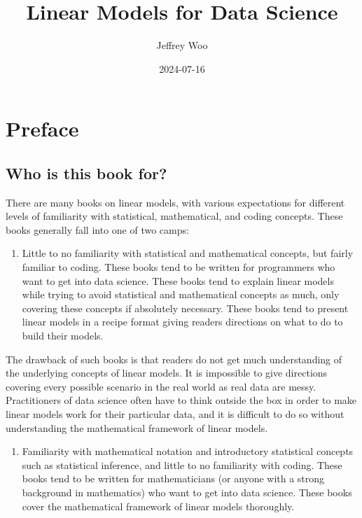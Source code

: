 \documentclass[
]{book}
\title{Linear Models for Data Science}
\author{Jeffrey Woo}
\date{2024-07-16}
\providecommand{\tightlist}{%
  \setlength{\itemsep}{0pt}\setlength{\parskip}{0pt}}
\begin{document}
\maketitle

{
\setcounter{tocdepth}{1}
\tableofcontents
}
\hypertarget{preface}{%
\chapter*{Preface}\label{preface}}

\hypertarget{who-is-this-book-for}{%
\section*{Who is this book for?}\label{who-is-this-book-for}}

There are many books on linear models, with various expectations for different levels of familiarity with statistical, mathematical, and coding concepts. These books generally fall into one of two camps:

\begin{enumerate}
\def\labelenumi{\arabic{enumi}.}
\tightlist
\item
  Little to no familiarity with statistical and mathematical concepts, but fairly familiar to coding. These books tend to be written for programmers who want to get into data science. These books tend to explain linear models while trying to avoid statistical and mathematical concepts as much, only covering these concepts if absolutely necessary. These books tend to present linear models in a recipe format giving readers directions on what to do to build their models.
\end{enumerate}

The drawback of such books is that readers do not get much understanding of the underlying concepts of linear models. It is impossible to give directions covering every possible scenario in the real world as real data are messy. Practitioners of data science often have to think outside the box in order to make linear models work for their particular data, and it is difficult to do so without understanding the mathematical framework of linear models.

\begin{enumerate}
\def\labelenumi{\arabic{enumi}.}
\setcounter{enumi}{1}
\tightlist
\item
  Familiarity with mathematical notation and introductory statistical concepts such as statistical inference, and little to no familiarity with coding. These books tend to be written for mathematicians (or anyone with a strong background in mathematics) who want to get into data science. These books cover the mathematical framework of linear models thoroughly.
\end{enumerate}
\end{document}
